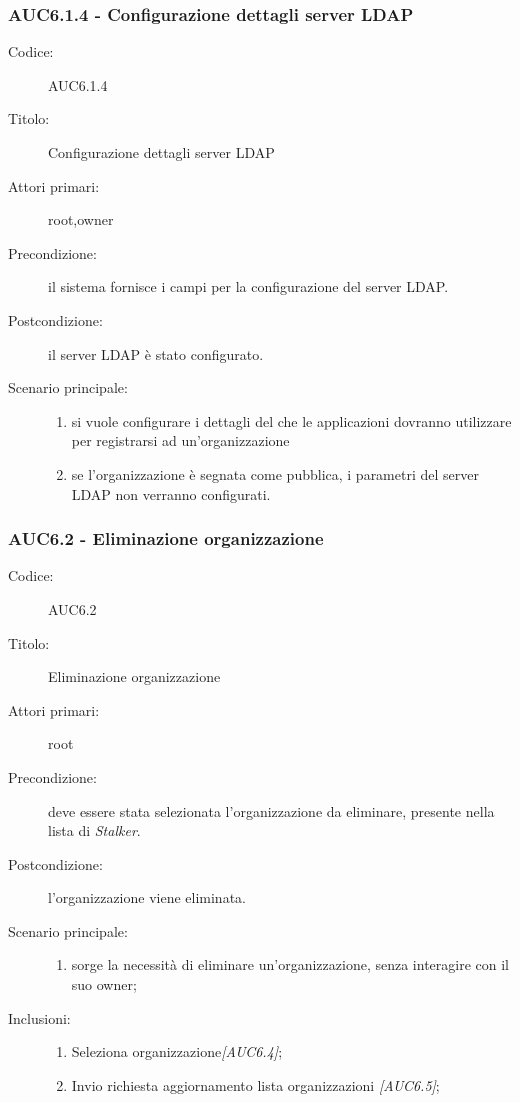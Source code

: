 \documentclass[casi-duso]{subfiles}
\begin{document}
  \subsubsection{AUC6.1.4 - Configurazione dettagli server LDAP}%
  \label{subsub:AUC6.1.4}
  \begin{description}
    \item[Codice:] AUC6.1.4
    \item[Titolo:] Configurazione dettagli server LDAP
    \item[Attori primari:] root,owner
    \item[Precondizione:] il sistema fornisce i campi per la configurazione del server LDAP.
    \item[Postcondizione:] il server LDAP è stato configurato.
    \item[Scenario principale:]
    \begin{enumerate}
      \item si vuole configurare i dettagli del  che le applicazioni dovranno utilizzare per registrarsi ad un'organizzazione
      \item se l'organizzazione è segnata come pubblica, i parametri del server LDAP non verranno configurati. 
    \end{enumerate}
  \end{description}

\subsubsection{AUC6.2 - Eliminazione organizzazione}%
\label{subsub:AUC6.2}
\begin{description}
  \item[Codice:] AUC6.2
  \item[Titolo:] Eliminazione organizzazione
  \item[Attori primari:] root
  \item[Precondizione:] deve essere stata selezionata l'organizzazione da eliminare, presente nella lista di \emph{Stalker}.
  \item[Postcondizione:] l'organizzazione viene eliminata.
  \item[Scenario principale:]
  \begin{enumerate}
    \item sorge la necessità di eliminare un'organizzazione, senza interagire con il suo owner;
  \end{enumerate}
  \item[Inclusioni:]
  \begin{enumerate}
    \item Seleziona organizzazione\emph{[AUC6.4]};
    \item Invio richiesta aggiornamento lista organizzazioni \emph{[AUC6.5]};
  \end{enumerate}
\end{description}
\end{document}
